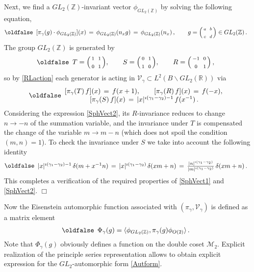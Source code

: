 \documentclass[12pt]{article}
\def\IR{\mathbb{R}}
\def\IZ{\mathbb{Z}}
\def\CM {\mathcal{M}}
\def\CV {\mathcal{V}}
\def\g {{\gamma}}
\def\c{\cdot}
\def\<{\langle}
\def\>{\rangle}
\def\be{\begin{eqnarray}\new\begin{array}{cc}}
\def\ee{\end{array}\end{eqnarray}}
\def\i{\imath}
\begin{document}
  Next,   we find a $GL_2(\IZ)$-invariant vector $\phi_{GL_2(\IZ)}$ by
  solving the   following equation,
 \be\nonumber
  [\pi_\gamma(g)\cdot \phi_{GL_2(\IZ)}](x)\,
  =\,\phi_{GL_2(\IZ)}(n_xg)\,=\,\phi_{GL_2(\IZ)}(n_x)\,,\qquad
  g=\Big(\begin{smallmatrix}a&&b\\&&\\c&&d\end{smallmatrix}\Big)\in GL_2(\IZ)\,.
 \ee
The group $GL_2(\IZ)$ is generated by
 \be
  T=\Big(\begin{smallmatrix}1&&1\\&&\\0&&1\end{smallmatrix}\Big),\qquad
  S=\Big(\begin{smallmatrix}0&&1\\&&\\1&&0\end{smallmatrix}\Big),\qquad
  R=\Big(\begin{smallmatrix}-1&&0\\&&\\0&&1\end{smallmatrix}\Big)\,,
 \ee
so by \eqref{RLaction} each generator is acting in
$\CV_\gamma\subset L^2(B\backslash GL_2(\IR))$ via
 \be\label{GL2Zrel}
  [\pi_{\g}(T)\,f](x)\,=\,f(x+1),\qquad
  [\pi_{\g}(R)\,f](x)\,=\,f(-x),\\
  \,[\pi_{\g}(S)\,f](x)\,=\,|x|^{\i(\g_1-\g_2)-1}\,f(x^{-1})\,.
 \ee
Considering the expression \eqref{SphVect2}, its $R$-invariance
reduces to change $n\to -n$ of the summation variable, and the
invariance under $T$ is compensated the change of the variable $m\to
m-n$ (which does not spoil the condition $(m,n)=1$). To check the
invariance under $S$ we take into account the following identity
 \be
  |x|^{\imath (\gamma_1-\gamma_2)-1}\, \delta(m+x^{-1}n)\,
  =\,|x|^{\imath (\gamma_1-\gamma_2)}\, \delta(xm+n)\,
  =\,\frac{|n|^{\imath (\gamma_1-\gamma_2)}}
  {|m|^{\imath (\gamma_1-\gamma_2)}}\, \delta(xm+n)\,.
 \ee
This completes a verification of the required properties of
\eqref{SphVect1} and \eqref{SphVect2}. $\Box$

Now the Eisenstein automorphic function
associated with $(\pi_\gamma,\CV_\gamma)$ is defined as a matrix  element
\be \label{Autform}
\Phi_{\gamma}(g)=\<\phi_{GL_2(\IZ)},\pi_\gamma(g) \phi_{O(2)}\>\,.
\ee
Note that $\Phi_{\gamma}(g)$ obviously  defines a function on the double coset $\CM_2$.
Explicit realization  of the  principle series representation allows
to obtain  explicit expression for the $GL_2$-automorphic
form  \eqref{Autform}.
\end{document}
